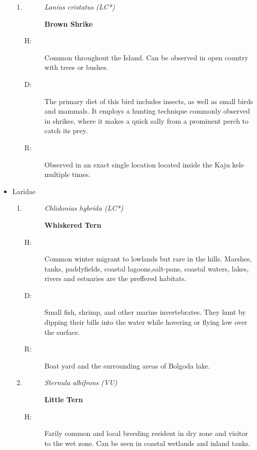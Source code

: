 \begin{itemize}
\begin{enumerate}
\item%
\begin{description}%
\item[]%
\textit{Lanius cristatus (LC*)}%
\item[]%
\textbf{Brown Shrike}%
\end{description}%
\begin{description}%
\item[H: ]%
Common throughout the Island. Can be observed in open country with trees or bushes.%
\item[D: ]%
The primary diet of this bird includes insects, as well as small birds and mammals. It employs a hunting technique commonly observed in shrikes, where it makes a quick sally from a prominent perch to catch its prey.%
\item[R: ]%
Observed in an exact single location located inside the Kaju kele multiple times.%
\end{description}%
\end{enumerate}%
\item%
Laridae%
\begin{enumerate}%
\item%
\begin{description}%
\item[]%
\textit{Chlidonias hybrida (LC*)}%
\item[]%
\textbf{Whiskered Tern}%
\end{description}%
\begin{description}%
\item[H: ]%
Common winter migrant to lowlands but rare in the hills. Marshes, tanks, paddyfields, coastal lagoons,salt{-}pans, coastal waters, lakes, rivers and estuaries are the preffered habitats.%
\item[D: ]%
 Small fish, shrimp, and other marine invertebrates. They hunt by dipping their bills into the water while hovering or flying low over the surface.%
\item[R: ]%
Boat yard and the surrounding areas of Bolgoda lake.%
\end{description}%
\item%
\begin{description}%
\item[]%
\textit{Sternula albifrons (VU)}%
\item[]%
\textbf{Little Tern}%
\end{description}%
\begin{description}%
\item[H: ]%
Farily common and local breeding resident in dry zone and visitor to the wet zone. Can be seen in coastal wetlands and inland tanks.%

\end{description}
\end{enumerate}
\end{itemize}
